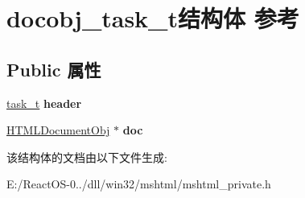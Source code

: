 \hypertarget{structdocobj__task__t}{}\section{docobj\+\_\+task\+\_\+t结构体 参考}
\label{structdocobj__task__t}
\subsection*{Public 属性}
\begin{DoxyCompactItemize}
\item 
\mbox{\label{structdocobj__task__t_a4492d1dd725a43cf3d40333fe8e93a4e}} 
\hyperlink{structtask__t}{task\+\_\+t} {\bfseries header}
\item 
\mbox{\label{structdocobj__task__t_a977e050870f1f023eb60baaf4f1c2872}} 
\hyperlink{struct_h_t_m_l_document_obj}{H\+T\+M\+L\+Document\+Obj} $\ast$ {\bfseries doc}
\end{DoxyCompactItemize}


该结构体的文档由以下文件生成\+:\begin{DoxyCompactItemize}
\item 
E\+:/\+React\+O\+S-\/0../dll/win32/mshtml/mshtml\+\_\+private.\+h\end{DoxyCompactItemize}
